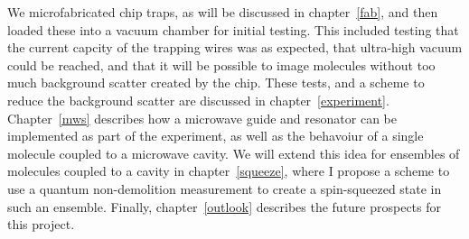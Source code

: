 We microfabricated chip traps, as will be discussed in chapter~\ref{fab}, and
then loaded these into a vacuum chamber for initial testing. This included
testing that the current capcity of the trapping wires was as expected, that
ultra-high vacuum could be reached, and that it will be possible to image
molecules without too much background scatter created by the chip. These tests,
and a scheme to reduce the background scatter are discussed in
chapter~\ref{experiment}. Chapter~\ref{mws} describes how a microwave guide and
resonator can be implemented as part of the experiment, as well as the
behavoiur of a single molecule coupled to a microwave cavity. We will extend
this idea for ensembles of molecules coupled to a cavity in
chapter~\ref{squeeze}, where I propose a scheme to use a quantum non-demolition
measurement to create a spin-squeezed state in such an ensemble. Finally,
chapter~\ref{outlook} describes the future prospects for this project.

